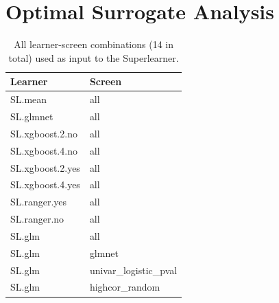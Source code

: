 \documentclass[]{article}
\author{}
\date{\vspace{-2.5em}}
\begin{document}
\hypertarget{optimal-surrogate}{%
\section{Optimal Surrogate Analysis}\label{optimal-surrogate}}

\begin{table}[!h]

\caption{\label{tab:learner-screens}All learner-screen combinations (14 in total) used as input to the Superlearner.}
\centering
\fontsize{9}{11}\selectfont
\begin{tabular}[t]{ll}
\toprule
Learner & Screen\\
\midrule
SL.mean & all\\
SL.glmnet & all\\
SL.xgboost.2.no & all\\
SL.xgboost.4.no & all\\
SL.xgboost.2.yes & all\\
SL.xgboost.4.yes & all\\
SL.ranger.yes & all\\
SL.ranger.no & all\\
SL.glm & all\\
SL.glm & glmnet\\
SL.glm & univar\_logistic\_pval\\
SL.glm & highcor\_random\\
\bottomrule
\end{tabular}
\end{table}

\clearpage
\end{document}
